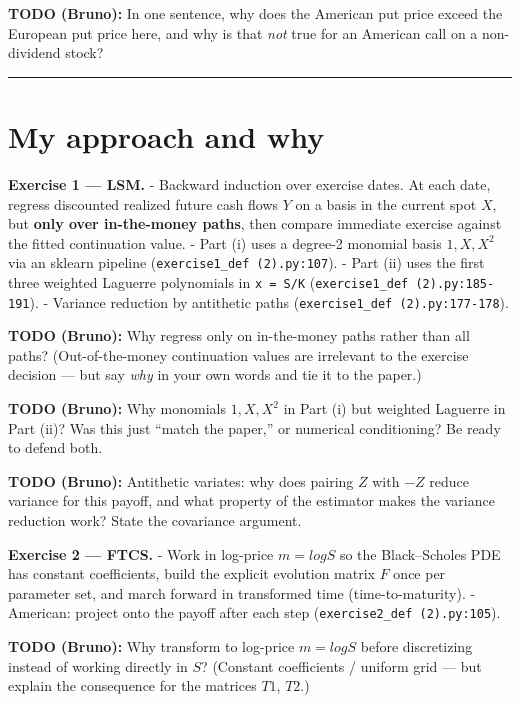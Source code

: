 \documentclass[
  11pt,
]{article}
\begin{document}
\textbf{TODO (Bruno):} In one sentence, why does the American put price
exceed the European put price here, and why is that \emph{not} true for
an American call on a non-dividend stock?

\begin{center}\rule{0.5\linewidth}{0.5pt}\end{center}

\hypertarget{my-approach-and-why}{%
\section{My approach and why}\label{my-approach-and-why}}

\textbf{Exercise 1 --- LSM.} - Backward induction over exercise dates.
At each date, regress discounted realized future cash flows \(Y\) on a
basis in the current spot \(X\), but \textbf{only over in-the-money
paths}, then compare immediate exercise against the fitted continuation
value. - Part (i) uses a degree-2 monomial basis \({1, X, X^2}\) via an
sklearn pipeline (\texttt{exercise1\_def\ (2).py:107}). - Part (ii) uses
the first three weighted Laguerre polynomials in \texttt{x\ =\ S/K}
(\texttt{exercise1\_def\ (2).py:185-191}). - Variance reduction by
antithetic paths (\texttt{exercise1\_def\ (2).py:177-178}).

\textbf{TODO (Bruno):} Why regress only on in-the-money paths rather
than all paths? (Out-of-the-money continuation values are irrelevant to
the exercise decision --- but say \emph{why} in your own words and tie
it to the paper.)

\textbf{TODO (Bruno):} Why monomials \({1, X, X^2}\) in Part (i) but
weighted Laguerre in Part (ii)? Was this just ``match the paper,'' or
numerical conditioning? Be ready to defend both.

\textbf{TODO (Bruno):} Antithetic variates: why does pairing \(Z\) with
\(-Z\) reduce variance for this payoff, and what property of the
estimator makes the variance reduction work? State the covariance
argument.

\textbf{Exercise 2 --- FTCS.} - Work in log-price \(m = log S\) so the
Black--Scholes PDE has constant coefficients, build the explicit
evolution matrix \(F\) once per parameter set, and march forward in
transformed time (time-to-maturity). - American: project onto the payoff
after each step (\texttt{exercise2\_def\ (2).py:105}).

\textbf{TODO (Bruno):} Why transform to log-price \(m = log S\) before
discretizing instead of working directly in \(S\)? (Constant
coefficients / uniform grid --- but explain the consequence for the
matrices \(T1\), \(T2\).)
\end{document}

